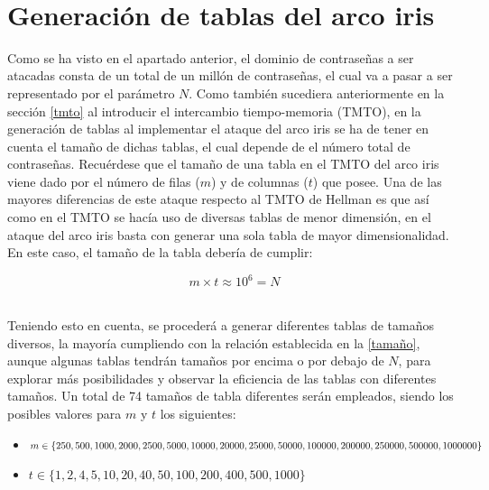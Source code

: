 \documentclass[12pt,spanish,listoffigures,listoftables]{tfgetsinf}
\begin{document}
~\\

\section{Generación de tablas del arco iris}

Como se ha visto en el apartado anterior, el dominio de contraseñas a ser atacadas consta de un total de un millón de contraseñas, el cual va a pasar a ser representado por el parámetro $N$. Como también sucediera anteriormente en la sección \ref{tmto} al introducir el intercambio tiempo-memoria (TMTO), en la generación de tablas al implementar el ataque del arco iris se ha de tener en cuenta el tamaño de dichas tablas, el cual depende de el número total de contraseñas. Recuérdese que el tamaño de una tabla en el TMTO  del arco iris viene dado por el número de filas ($m$) y de columnas ($t$) que posee. Una de las mayores diferencias de este ataque respecto al TMTO de Hellman es que así como en el TMTO se hacía uso de diversas tablas de menor dimensión, en el ataque del arco iris basta con generar una sola tabla de mayor dimensionalidad. En este caso, el tamaño de la tabla debería de cumplir:

\begin{center}
    \begin{equation}
        \tag{Fórmula 1}
        m \times t \approx 10^6 = N
        \label{tamaño}
    \end{equation}
\end{center}
~\\

Teniendo esto en cuenta, se procederá a generar diferentes tablas de tamaños diversos, la mayoría cumpliendo con la relación establecida en la \ref{tamaño}, aunque algunas tablas tendrán tamaños por encima o por debajo de $N$, para explorar más posibilidades y observar la eficiencia de las tablas con diferentes tamaños. Un total de 74 tamaños de tabla diferentes serán empleados, siendo los posibles valores para $m$ y $t$ los siguientes:

\begin{itemize}

    \item $m \in \{250, 500, 1000, 2000, 2500, 5000, 10000, 20000, \\
    25000, 50000, 100000, 200000, 250000, 500000, 1000000\}$
    
    \item $t \in \{1, 2, 4, 5, 10, 20, 40, 50, 100, 200, 400, 500, 1000\}$
    
\end{itemize}
\end{document}
